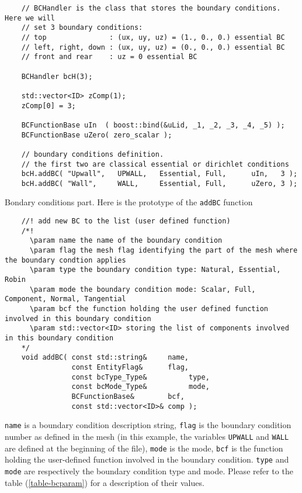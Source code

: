 \begin{verbatim}
    // BCHandler is the class that stores the boundary conditions. Here we will
    // set 3 boundary conditions:
    // top               : (ux, uy, uz) = (1., 0., 0.) essential BC
    // left, right, down : (ux, uy, uz) = (0., 0., 0.) essential BC
    // front and rear    : uz = 0 essential BC

    BCHandler bcH(3);

    std::vector<ID> zComp(1);
    zComp[0] = 3;

    BCFunctionBase uIn  ( boost::bind(&uLid, _1, _2, _3, _4, _5) );
    BCFunctionBase uZero( zero_scalar );

    // boundary conditions definition.
    // the first two are classical essential or dirichlet conditions
    bcH.addBC( "Upwall",   UPWALL,   Essential, Full,      uIn,   3 );
    bcH.addBC( "Wall",     WALL,     Essential, Full,      uZero, 3 );
\end{verbatim}

Bondary conditions  part. Here is the prototype of the \verb!addBC! function 

\begin{verbatim}
    //! add new BC to the list (user defined function)
    /*!
      \param name the name of the boundary condition
      \param flag the mesh flag identifying the part of the mesh where the boundary condtion applies
      \param type the boundary condition type: Natural, Essential, Robin
      \param mode the boundary condition mode: Scalar, Full, Component, Normal, Tangential
      \param bcf the function holding the user defined function involved in this boundary condition
      \param std::vector<ID> storing the list of components involved in this boundary condition
    */
    void addBC( const std::string&     name,
                const EntityFlag&      flag,
                const bcType_Type&          type,
                const bcMode_Type&          mode,
                BCFunctionBase&        bcf,
                const std::vector<ID>& comp );
\end{verbatim}
\verb!name! is a boundary condition description string,
\verb!flag! is the boundary condition number as defined in the mesh (in this example, the variables \verb+UPWALL+
and \verb+WALL+ are defined at the beginning of the file),
\verb!mode! is the mode, \verb!bcf! is the function holding the user-defined function involved
in the boundary condition. \verb!type! and \verb!mode! are respectively the boundary condition type
and mode. Please refer to the table (\ref{table-bcparam}) for a description of their values.

